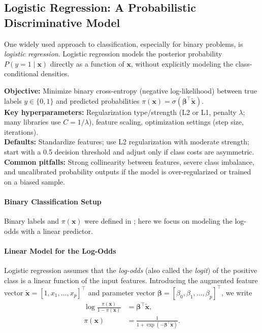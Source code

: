 \subsection{Logistic Regression: A Probabilistic Discriminative Model}
\label{sec:logistic_logistic_regression_a_probabilistic_discriminative_model}

One widely used approach to classification, especially for binary problems, is \emph{logistic regression}. Logistic regression models the posterior probability \(P(y=1 \mid \mathbf{x})\) directly as a function of \(\mathbf{x}\), without explicitly modeling the class-conditional densities.

\begin{tcolorbox}[summarybox, title={Logistic regression at a glance}]
\textbf{Objective:} Minimize binary cross\hyp{}entropy (negative log-likelihood) between true labels \(y\in\{0,1\}\) and predicted probabilities \(\pi(\mathbf{x})=\sigma(\boldsymbol{\beta}^\top \tilde{\mathbf{x}})\).\\
\textbf{Key hyperparameters:} Regularization type/strength (L2 or L1, penalty \(\lambda\); many libraries use \(C=1/\lambda\)), feature scaling, optimization settings (step size, iterations).\\
\textbf{Defaults:} Standardize features; use L2 regularization with moderate strength; start with a 0.5 decision threshold and adjust only if class costs are asymmetric.\\
\textbf{Common pitfalls:} Strong collinearity between features, severe class imbalance, and uncalibrated probability outputs if the model is over-regularized or trained on a biased sample.
\end{tcolorbox}

\paragraph{Binary Classification Setup}

Binary labels and \(\pi(\mathbf{x})\) were defined in ; here we focus on modeling the log-odds with a linear predictor.

\paragraph{Linear Model for the Log-Odds}

Logistic regression assumes that the \emph{log-odds} (also called the \emph{logit}) of the positive class is a linear function of the input features. Introducing the augmented feature vector \(\tilde{\mathbf{x}} = [1, x_1, \ldots, x_p]^\top\) and parameter vector \(\boldsymbol{\beta} = [\beta_0, \beta_1, \ldots, \beta_p]^\top\), we write
\begin{equation}
    \begin{aligned}
        \log \frac{\pi(\mathbf{x})}{1 - \pi(\mathbf{x})} &= \boldsymbol{\beta}^\top \tilde{\mathbf{x}},\\
        \pi(\mathbf{x}) &= \frac{1}{1 + \exp\left(-\boldsymbol{\beta}^\top \tilde{\mathbf{x}}\right)}.
    \end{aligned}
    \label{eq:logit_linear}
\end{equation}

